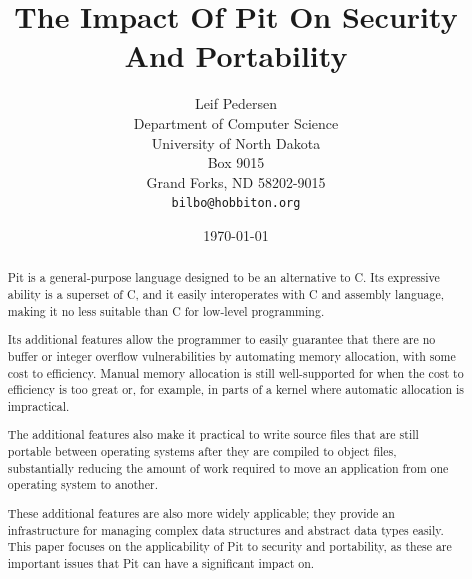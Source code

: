 \title{The Impact Of Pit On Security And Portability}
\author{Leif Pedersen\\Department of Computer Science\\University of North Dakota\\Box 9015\\Grand Forks, ND 58202-9015\\\texttt{bilbo@hobbiton.org}}
\date{\today}
\maketitle

\begin{abstract}
	Pit\cite{pit,2006pedersen} is a general-purpose language designed to be an
	alternative to C.  Its expressive ability is a superset of C, and it easily
	interoperates with C and assembly language, making it no less suitable than C
	for low-level programming.

	Its additional features allow the programmer to easily guarantee that there are
	no buffer or integer overflow vulnerabilities by automating memory allocation,
	with some cost to efficiency.  Manual memory allocation is still well-supported
	for when the cost to efficiency is too great or, for example, in parts of a
	kernel where automatic allocation is impractical.

	The additional features also make it practical to write source files that are
	still portable between operating systems after they are compiled to object
	files, substantially reducing the amount of work required to move an
	application from one operating system to another.

	These additional features are also more widely applicable; they provide an
	infrastructure for managing complex data structures and abstract data types
	easily.  This paper focuses on the applicability of Pit to security and
	portability, as these are important issues that Pit can have a significant
	impact on.
\end{abstract}
